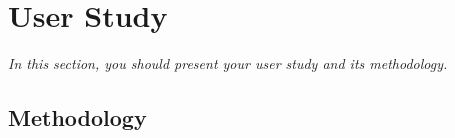 \chapter{User Study}
\label{ch:userstudy}

\emph{In this section, you should present your user study and its methodology. }

\section{Methodology}




